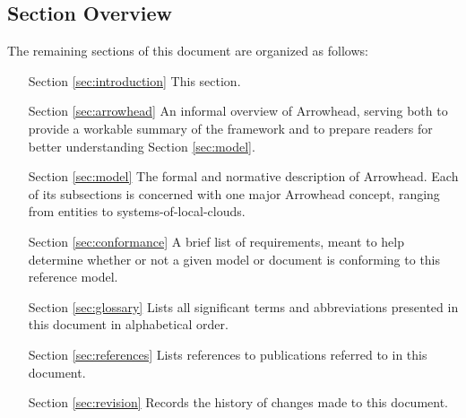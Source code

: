 \subsection{Section Overview}
\label{sec:introduction:sections}

The remaining sections of this document are organized as follows:
\vspace*{2mm}
\begin{itemize}[leftmargin=2cm,rightmargin=0pt,labelwidth=2cm,labelsep=0pt,itemindent=0pt,parsep=0.1cm,topsep=0.1cm,align=left]

\item[Section \ref{sec:introduction}]
This section.

\item[Section \ref{sec:arrowhead}]
An informal overview of Arrowhead, serving both to provide a workable summary of the framework and to prepare readers for better understanding Section \ref{sec:model}.

\item[Section \ref{sec:model}]
The formal and normative description of Arrowhead.
Each of its subsections is concerned with one major Arrowhead concept, ranging from entities to systems-of-local-clouds.

\item[Section \ref{sec:conformance}]
A brief list of requirements, meant to help determine whether or not a given model or document is conforming to this reference model.

\item[Section \ref{sec:glossary}]
Lists all significant terms and abbreviations presented in this document in alphabetical order.

\item[Section \ref{sec:references}]
Lists references to publications referred to in this document.

\item[Section \ref{sec:revision}]
Records the history of changes made to this document.

\end{itemize}
